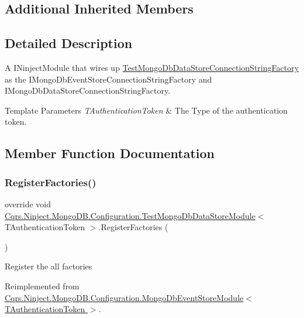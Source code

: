 \subsection*{Additional Inherited Members}


\subsection{Detailed Description}
A I\+Ninject\+Module that wires up \hyperlink{classCqrs_1_1Ninject_1_1MongoDB_1_1TestMongoDbDataStoreConnectionStringFactory}{Test\+Mongo\+Db\+Data\+Store\+Connection\+String\+Factory} as the I\+Mongo\+Db\+Event\+Store\+Connection\+String\+Factory and I\+Mongo\+Db\+Data\+Store\+Connection\+String\+Factory. 


\begin{DoxyTemplParams}{Template Parameters}
{\em T\+Authentication\+Token} & The Type of the authentication token.\\
\hline
\end{DoxyTemplParams}


\subsection{Member Function Documentation}
\mbox{\label{classCqrs_1_1Ninject_1_1MongoDB_1_1Configuration_1_1TestMongoDbDataStoreModule_abff300412dc5c2602db5f51925204c6e_abff300412dc5c2602db5f51925204c6e}} 
\subsubsection{\texorpdfstring{Register\+Factories()}{RegisterFactories()}}
{\footnotesize\ttfamily override void \hyperlink{classCqrs_1_1Ninject_1_1MongoDB_1_1Configuration_1_1TestMongoDbDataStoreModule}{Cqrs.\+Ninject.\+Mongo\+D\+B.\+Configuration.\+Test\+Mongo\+Db\+Data\+Store\+Module}$<$ T\+Authentication\+Token $>$.Register\+Factories (\begin{DoxyParamCaption}{ }\end{DoxyParamCaption})\hspace{0.3cm}{\ttfamily [virtual]}}



Register the all factories 



Reimplemented from \hyperlink{classCqrs_1_1Ninject_1_1MongoDB_1_1Configuration_1_1MongoDbEventStoreModule_a32cbf7060777484eb68c4dc032109e6c_a32cbf7060777484eb68c4dc032109e6c}{Cqrs.\+Ninject.\+Mongo\+D\+B.\+Configuration.\+Mongo\+Db\+Event\+Store\+Module$<$ T\+Authentication\+Token $>$}.

